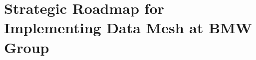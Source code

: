 
\chapter{Strategic Roadmap for Implementing Data Mesh at BMW Group}
\label{chap: Strategic Roadmap for Implementing Data Mesh at BMW Group}
